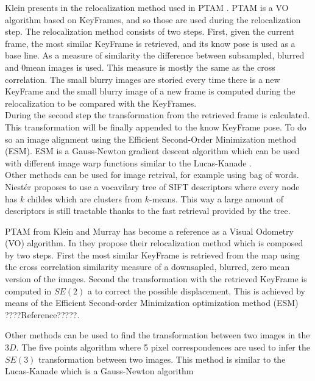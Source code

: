 Klein presents in \cite{Klein2008improving} the relocalization method used in PTAM \cite{KleinMurray2007}. PTAM is a VO algorithm based on KeyFrames, and so those are used during the relocalization step. The relocalization method consists of two steps. First, given the current frame, the most similar KeyFrame is retrieved, and its know pose is used as a base line. As a measure of similarity the difference between subsampled, blurred and 0mean images is used. This measure is mostly the same as the cross correlation. The small blurry images are storied every time there is a new KeyFrame and the small blurry image of a new frame is computed during the relocalization to be compared with the KeyFrames.\\

During the second step the transformation from the retrieved frame is calculated. This transformation will be finally appended to the know KeyFrame pose. To do so an image alignment using the Efficient Second-Order Minimization method (ESM). ESM is a Gauss-Newton gradient descent algorithm which can be used with different image warp functions similar to the Lucas-Kanade \cite{Baker2004}.\\

Other methods can be used for image retrival, for example using bag of words. Niest\'er \cite{Nister2006} proposes to use a vocavilary tree of SIFT descriptors where every node has $k$ childes which are clusters from $k$-means. This way a large amount of descriptors is still tractable thanks to the fast retrieval provided by the tree.

PTAM from Klein and Murray \cite{KleinMurray2007} has become a reference as a Visual Odometry (VO) algorithm. In \cite{Klein2008improving} they propose their relocalization method which is composed by two steps. First the most similar KeyFrame is retrieved from the map using the cross correlation similarity measure of a downsapled, blurred, zero mean version of the images. Second the transformation with the retrieved KeyFrame is computed in $SE(2)$ a to correct the possible displacement. This is achieved by means of the Efficient Second-order Minimization optimization method (ESM) ????Reference?????.

Other methods can be used to find the transformation between two images in the $3D$. The five points algorithm \cite{nister2004efficient} where 5 pixel correspondences are used to infer the $SE(3)$ transformation between two images. This method is similar to the Lucas-Kanade \cite{Baker2004} which is a Gauss-Newton algorithm 



